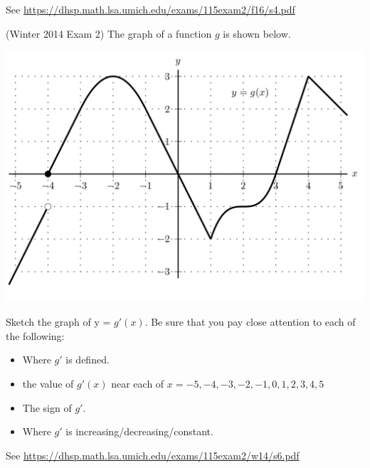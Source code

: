 \documentclass[11pt]{exam}
\begin{document}
\begin{questions}
\begin{solution}
 See \href{https://dhsp.math.lsa.umich.edu/exams/115exam2/f16/s4.pdf}{https://dhsp.math.lsa.umich.edu/exams/115exam2/f16/s4.pdf}  
\end{solution}
\vspace{1.5in}
\question (Winter 2014 Exam 2) The graph of a function $g$ is shown below.
  \begin{center}
  \includegraphics[scale=0.4]{Figures/graphg.png}
  \end{center}
Sketch the graph of y = $g'(x)$. Be sure that you pay close attention to each of the following:
\begin{itemize}
\item Where $g'$ is defined.
\item the value of $g'(x)$ near each of $x = -5,-4,-3,-2,-1,0,1,2,3,4,5$
\item The sign of $g'$.
\item Where $g'$ is increasing/decreasing/constant.
\end{itemize}
\begin{solution}
  See \href{https://dhsp.math.lsa.umich.edu/exams/115exam2/w14/s6.pdf}{https://dhsp.math.lsa.umich.edu/exams/115exam2/w14/s6.pdf}
\end{solution}
\end{questions}
\end{document}
